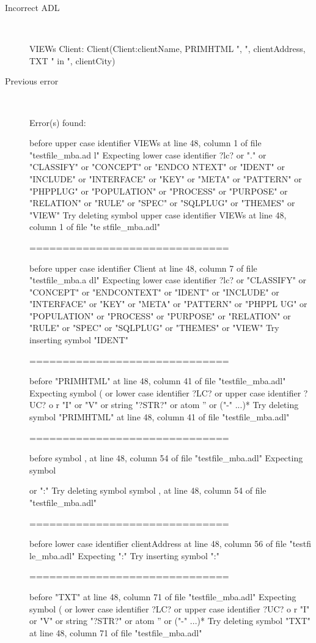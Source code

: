 \begin{description}
  \item[Incorrect ADL]~\\
\begin{adl}
VIEWs Client: Client(Client:clientName, PRIMHTML ", ", clientAddress, TXT " in ", clientCity)\end{adl}
  \item[Previous error]~\\
\begin{haskell}
Error(s) found:

before upper case identifier VIEWs at line 48, column 1 of file "testfile_mba.ad
l"
Expecting lower case identifier ?lc? or "." or "CLASSIFY" or "CONCEPT" or "ENDCO
NTEXT" or "IDENT" or "INCLUDE" or "INTERFACE" or "KEY" or "META" or "PATTERN" or
 "PHPPLUG" or "POPULATION" or "PROCESS" or "PURPOSE" or "RELATION" or "RULE" or
"SPEC" or "SQLPLUG" or "THEMES" or "VIEW"
Try deleting symbol upper case identifier VIEWs at line 48, column 1 of file "te
stfile_mba.adl"

==============================

before upper case identifier Client at line 48, column 7 of file "testfile_mba.a
dl"
Expecting lower case identifier ?lc? or "CLASSIFY" or "CONCEPT" or "ENDCONTEXT"
or "IDENT" or "INCLUDE" or "INTERFACE" or "KEY" or "META" or "PATTERN" or "PHPPL
UG" or "POPULATION" or "PROCESS" or "PURPOSE" or "RELATION" or "RULE" or "SPEC"
or "SQLPLUG" or "THEMES" or "VIEW"
Try inserting symbol "IDENT"

==============================

before "PRIMHTML" at line 48, column 41 of file "testfile_mba.adl"
Expecting symbol ( or lower case identifier ?LC? or upper case identifier ?UC? o
r "I" or "V" or string "?STR?" or atom '' or ("-" ...)*
Try deleting symbol "PRIMHTML" at line 48, column 41 of file "testfile_mba.adl"

==============================

before symbol , at line 48, column 54 of file "testfile_mba.adl"
Expecting symbol { or ":"
Try deleting symbol symbol , at line 48, column 54 of file "testfile_mba.adl"

==============================

before lower case identifier clientAddress at line 48, column 56 of file "testfi
le_mba.adl"
Expecting ":"
Try inserting symbol ":"

==============================

before "TXT" at line 48, column 71 of file "testfile_mba.adl"
Expecting symbol ( or lower case identifier ?LC? or upper case identifier ?UC? o
r "I" or "V" or string "?STR?" or atom '' or ("-" ...)*
Try deleting symbol "TXT" at line 48, column 71 of file "testfile_mba.adl"

}
\end{haskell}
\end{description}
